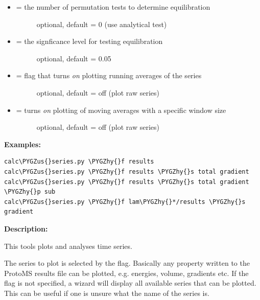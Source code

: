 \documentclass[letterpaper,10pt,english]{sphinxmanual}
\def\PYGZus{\char`\_}
\def\PYGZhy{\char`\-}
\begin{document}
\begin{itemize}
\item {} \begin{description}
\item[{ = the number of permutation tests to determine equilibration}] \leavevmode
optional, default = 0 (use analytical test)

\end{description}

\item {} \begin{description}
\item[{ = the signficance level for testing equilibration}] \leavevmode
optional, default = 0.05

\end{description}

\item {} \begin{description}
\item[{ = flag that turns \emph{on} plotting running averages of the series}] \leavevmode
optional, default = off (plot raw series)

\end{description}

\item {} \begin{description}
\item[{ = turns \emph{on} plotting of moving averages with a specific window size}] \leavevmode
optional, default = off (plot raw series)

\end{description}

\end{itemize}

\textbf{Examples:}

\begin{Verbatim}[frame=single,commandchars=\\\{\}]
calc\PYGZus{}series.py \PYGZhy{}f results
calc\PYGZus{}series.py \PYGZhy{}f results \PYGZhy{}s total gradient
calc\PYGZus{}series.py \PYGZhy{}f results \PYGZhy{}s total gradient \PYGZhy{}p sub
calc\PYGZus{}series.py \PYGZhy{}f lam\PYGZhy{}*/results \PYGZhy{}s gradient
\end{Verbatim}

\textbf{Description:}

This tools plots and analyses time series.

The series to plot is selected by the  flag. Basically any property written to the ProtoMS results file can be plotted, e.g. energies, volume, gradients etc. If the  flag is not specified, a wizard will display all available series that can be plotted. This can be useful if one is unsure what the name of the series is.
\end{document}
